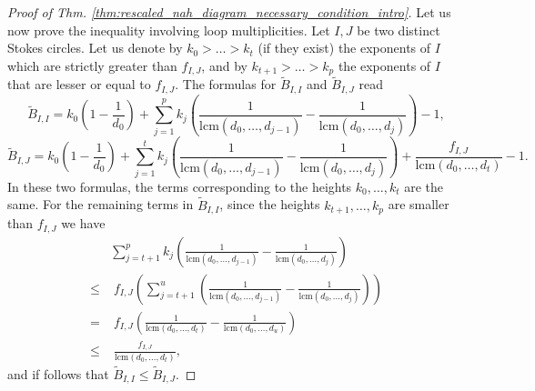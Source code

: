 \documentclass[11pt,a4paper]{amsart}
\numberwithin{equation}{section}
\begin{document}
\begin{proof}[Proof of Thm. \ref{thm:rescaled_nah_diagram_necessary_condition_intro}]
Let us now prove the inequality involving loop multiplicities. Let $I,J$ be two distinct Stokes circles. Let us denote by $k_0>\dots > k_t$ (if they exist) the exponents of $I$ which are strictly greater than $f_{I,J}$, and by $k_{t+1}>\dots >k_p$ the exponents of $I$ that are lesser or equal to $f_{I,J}$. The formulas for $\widetilde B_{I,I}$ and $\widetilde B_{I,J}$ read
\[
\widetilde B_{I,I}=k_0(1-\frac{1}{d_0})+ \sum_{j=1}^p  k_j\left(\frac{1}{\mathrm{lcm}(d_0, \dots, d_{j-1})}-\frac{1}{\mathrm{lcm}(d_0, \dots, d_{j})}\right)-1,
\]
\[
\widetilde B_{I,J}=k_0(1-\frac{1}{d_0})+ \sum_{j=1}^t k_j\left(\frac{1}{\mathrm{lcm}(d_0, \dots, d_{j-1})}-\frac{1}{\mathrm{lcm}(d_0, \dots, d_{j})}\right)+\frac{f_{I,J}}{\mathrm{lcm}(d_0, \dots, d_{t})}-1.
\]
In these two formulas, the terms corresponding to the heights $k_0, \dots, k_t$ are the same. For the remaining terms in $\widetilde B_{I,I}$, since the heights $k_{t+1}, \dots, k_p$ are smaller than $f_{I,J}$ we have
\begin{align*}
&\sum_{j=t+1}^p  k_j\left(\frac{1}{\mathrm{lcm}(d_0, \dots, d_{j-1})}-\frac{1}{\mathrm{lcm}(d_0, \dots, d_{j})}\right)\\
\leq & \;f_{I,J}\left(\sum_{j=t+1}^u  \left(\frac{1}{\mathrm{lcm}(d_0, \dots, d_{j-1})}-\frac{1}{\mathrm{lcm}(d_0, \dots, d_{j})}\right)\right)\\
=& \;f_{I,J}\left(\frac{1}{\mathrm{lcm}(d_0, \dots, d_{t})}-\frac{1}{\mathrm{lcm}(d_0, \dots, d_{u})}\right)\\
\leq & \;\frac{f_{I,J}}{\mathrm{lcm}(d_0, \dots, d_{t})},
\end{align*} 
and if follows that $\widetilde B_{I,I}\leq \widetilde B_{I,J}$.
\end{proof}
\end{document}
